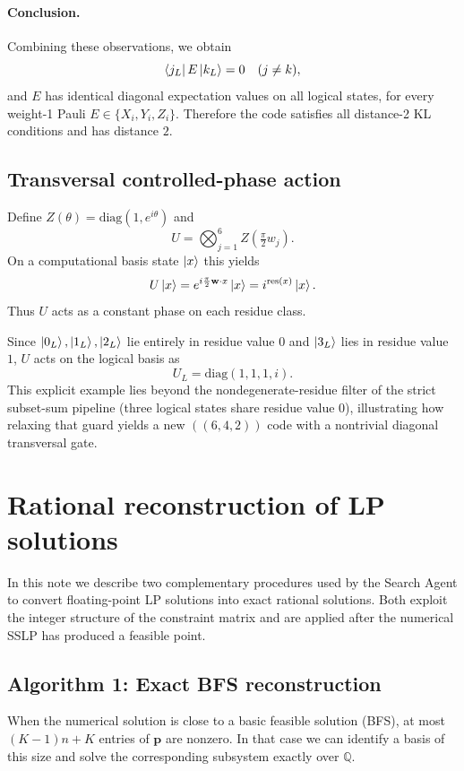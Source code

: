 \documentclass[pdflatex,sn-nature]{sn-jnl}%
\theoremstyle{thmstyleone}%
\theoremstyle{thmstyletwo}%
\theoremstyle{thmstylethree}%
\begin{document}
\begin{appendices}
\paragraph{Conclusion.}
Combining these observations, we obtain
\[
    \bra{j_L}E\ket{k_L}=0\quad (j\neq k),
\]
and $E$ has identical diagonal expectation values on all logical states, for every weight-1 Pauli $E\in\{X_i,Y_i,Z_i\}$. Therefore the code satisfies all distance-2 KL conditions and has distance $2$.

\subsection{Transversal controlled-phase action}

Define $Z(\theta)=\mathrm{diag}(1,e^{i\theta})$ and
\[
    U=\bigotimes_{j=1}^6 Z \left(\tfrac{\pi}{2}w_j\right).
\]
On a computational basis state $\ket{x}$ this yields
\[
    U\ket{x}=e^{i\frac{\pi}{2} \mathbf w\cdot x}\ket{x}
    =i^{\operatorname{res}(x)}\ket{x}.
\]
Thus $U$ acts as a constant phase on each residue class.

Since $\ket{0_L},\ket{1_L},\ket{2_L}$ lie entirely in residue value $0$ and $\ket{3_L}$ lies in residue value $1$, $U$ acts on the logical basis as
\[
    U_L=\mathrm{diag}(1,1,1,i).
\]
This explicit example lies beyond the nondegenerate-residue filter of the strict subset-sum pipeline (three logical states share residue value $0$), illustrating how relaxing that guard yields a new $((6,4,2))$ code with a nontrivial diagonal transversal gate.



\section{Rational reconstruction of LP solutions}
\label{supp:rational}

In this note we describe two complementary procedures used by the Search Agent to convert floating-point LP solutions into exact rational solutions. Both exploit the integer structure of the constraint matrix and are applied after the numerical SSLP has produced a feasible point.

\subsection{Algorithm 1: Exact BFS reconstruction}

When the numerical solution is close to a basic feasible solution (BFS), at most $(K-1)n+K$ entries of $\mathbf p$ are nonzero. In that case we can identify a basis of this size and solve the corresponding subsystem exactly over $\mathbb Q$.


\end{appendices}
\end{document}

